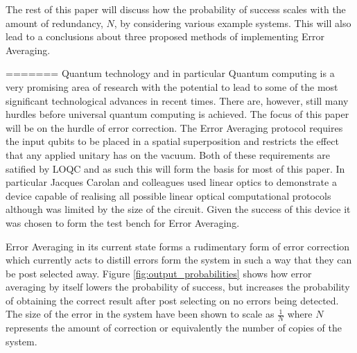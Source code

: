 \documentclass[aps,pra,twocolumn,superscriptaddress,numerical]{revtex4-1}
\begin{document}
	The rest of this paper will discuss how the probability of success scales with the amount of redundancy, $N$, by considering various example systems. This will also lead to a conclusions about three proposed methods of implementing Error Averaging.
		
=======
Quantum technology and in particular Quantum computing is a very promising area of research with the potential to lead to some of the most significant technological advances in recent times. There are, however, still many hurdles before universal quantum computing is achieved. The focus of this paper will be on the hurdle of error correction. The Error Averaging protocol requires the input qubits to be placed in a spatial superposition and restricts the effect that any applied unitary has on the vacuum. Both of these requirements are satified by LOQC and as such this will form the basis for most of this paper. In particular Jacques Carolan and colleagues \cite{ULO} used linear optics to demonstrate a device capable of realising all possible linear optical computational protocols although was limited by the size of the circuit. Given the success of this device it was chosen to form the test bench for Error Averaging.

Error Averaging in its current state forms a rudimentary form of error correction which currently acts to distill errors form the system in such a way that they can be post selected away. Figure \ref{fig:output_probabilities} shows how error averaging by itself lowers the probability of success, but increases the probability of obtaining the correct result after post selecting on no errors being detected. The size of the error in the system have been shown to scale as $\frac{1}{N}$ where $N$ represents the amount of correction or equivalently the number of copies of the system.
\end{document}
